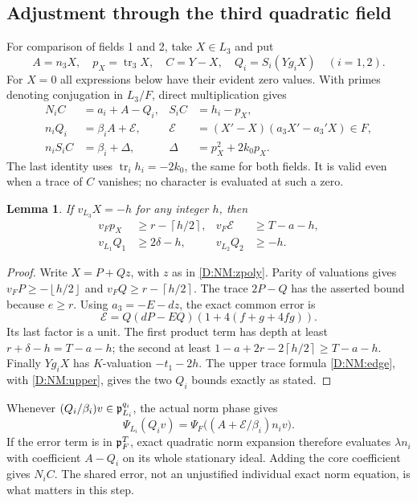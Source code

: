 \documentclass[11pt]{amsart}
\newtheorem{lemma}[theorem]{Lemma}
\theoremstyle{definition}
\theoremstyle{remark}
\newcommand{\ceil}[1]{\left\lceil #1\right\rceil}
\newcommand{\floor}[1]{\left\lfloor #1\right\rfloor}
\begin{document}
\subsection{Adjustment through the third quadratic field}
For comparison of fields 1 and 2, take $X\in L_3$ and put
\begin{equation}\label{D:NM:adjust}
 A=n_3X,\quad p_X=\operatorname{tr}_3X,\quad C=Y-X,\quad
 Q_i=S_i(Yg_iX)\quad(i=1,2).
\end{equation}
For $X=0$ all expressions below have their evident zero values.
With primes denoting conjugation in $L_3/F$, direct multiplication gives
\begin{align}
 N_iC&=a_i+A-Q_i,&S_iC&=h_i-p_X,                       \label{D:NM:commonC}\\
 n_iQ_i&=\beta_i A+\mathcal E,&
 \mathcal E&=(X'-X)(a_3X'-a_3'X)\in F,               \label{D:NM:common-error}\\
 n_iS_iC&=\beta_i+\Delta,&
 \Delta&=p_X^2+2k_0p_X.                              \label{D:NM:common-Delta}
\end{align}
The last identity uses $\operatorname{tr}_i h_i=-2k_0$, the same for both
fields. It is valid even when a trace of $C$ vanishes; no character is
evaluated at such a zero.

\begin{lemma}\label{D:NM:bounds}
If $v_{L_3}X=-h$ for any integer $h$, then
\begin{equation}\label{D:NM:bounds-eq}
 \begin{aligned}
 v_Fp_X&\ge r-\ceil{h/2},& v_F\mathcal E&\ge T-a-h,\\
 v_{L_1}Q_1&\ge2\delta-h,&v_{L_2}Q_2&\ge-h.
 \end{aligned}
\end{equation}
\end{lemma}
\begin{proof}
Write $X=P+Qz$, with $z$ as in \eqref{D:NM:zpoly}. Parity of valuations gives
$v_FP\ge-\floor{h/2}$ and $v_FQ\ge r-\ceil{h/2}$.
The trace $2P-Q$ has the asserted bound because $e\ge r$.
Using $a_3=-E-dz$, the exact common error is
\[
 \mathcal E=Q(dP-EQ)(1+4(f+g+4fg)).
\]
Its last factor is a unit. The first product term has depth at least
$r+\delta-h=T-a-h$; the second at least
$1-a+2r-2\ceil{h/2}\ge T-a-h$.
Finally $Yg_iX$ has $K$-valuation $-t_1-2h$.
The upper trace formula \eqref{D:NM:edge}, with \eqref{D:NM:upper}, gives the two
$Q_i$ bounds exactly as stated.
\end{proof}
Whenever $(Q_i/\beta_i)v\in\mathfrak p_{L_i}^{q_i}$, the actual norm phase gives
\begin{equation}\label{D:NM:Qphase}
 \Psi_{L_i}(Q_iv)
   =\Psi_F\bigl((A+\mathcal E/\beta_i)n_i v\bigr).
\end{equation}
If the error term is in $\mathfrak p_F^T$, exact quadratic norm expansion
therefore evaluates $\lambda n_i$ with coefficient $A-Q_i$ on its
whole stationary ideal. Adding the core coefficient gives $N_iC$.
The shared error, not an unjustified individual exact norm equation,
is what matters in this step.
\end{document}
